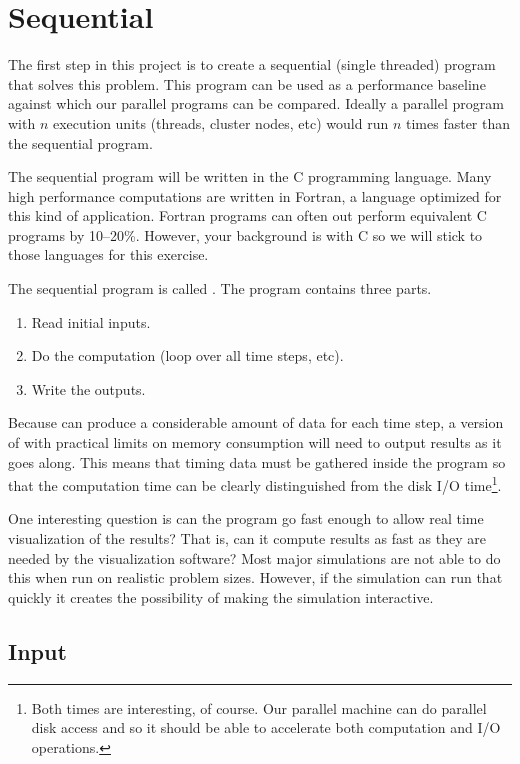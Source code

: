 
\section{Sequential}
\label{sec:sequential}

The first step in this project is to create a sequential (single threaded) program that solves
this problem. This program can be used as a performance baseline against which our parallel
programs can be compared. Ideally a parallel program with $n$ execution units (threads, cluster
nodes, etc) would run $n$ times faster than the sequential program.

The sequential program will be written in the C programming language. Many high performance
computations are written in Fortran, a language optimized for this kind of application. Fortran
programs can often out perform equivalent C programs by 10--20\%. However, your background is
with C so we will stick to those languages for this exercise.

The sequential program is called . The program contains three parts.
\begin{enumerate}
\item Read initial inputs.
\item Do the computation (loop over all time steps, etc).
\item Write the outputs.
\end{enumerate}

Because  can produce a considerable amount of data for each time step, a
version of  with practical limits on memory consumption will need to output
results as it goes along. This means that timing data must be gathered inside the program so
that the computation time can be clearly distinguished from the disk I/O time\footnote{Both
  times are interesting, of course. Our parallel machine can do parallel disk access and so it
  should be able to accelerate both computation and I/O operations.}.

One interesting question is can the program go fast enough to allow real time visualization of
the results? That is, can it compute results as fast as they are needed by the visualization
software? Most major simulations are not able to do this when run on realistic problem sizes.
However, if the simulation can run that quickly it creates the possibility of making the
simulation interactive.

\subsection{Input}
\label{sec:sequential-input}

